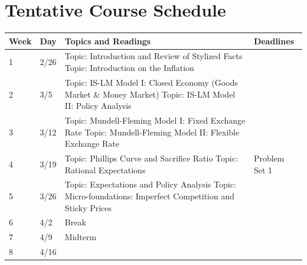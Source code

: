 \documentclass[12pt]{article}
\begin{document}
\section*{Tentative Course Schedule}

\newlength\bb
\setlength{}
\newlength\qq
\setlength{}
\newlength\rr
\setlength{}
\newlength\pp
\setlength{}
\begin{tabular}{|p{\bb}|p{\bb}|p{\pp}|p{\rr}|}
    \hline
        Week & Day & Topics and Readings & Deadlines \\
    \hline
    \hline
        1
        &
        2/26
        &
        Topic: Introduction and Review of Stylized Facts
        \newline
        Topic: Introduction on the Inflation
        &
    \\
    \hline
        2
        &
        3/5
        &
        Topic: IS-LM Model I: Closed Economy (Goods Market \& Money Market)
        \newline
        Topic: IS-LM Model II: Policy Analysis
        &
    \\
    \hline

 3
        &
        3/12
        &
        Topic: Mundell-Fleming Model I: Fixed Exchange Rate
        \newline
        Topic: Mundell-Fleming Model II: Flexible Exchange Rate
        &
    \\
    \hline
        4
        &

   3/19
        &
        Topic: Phillips Curve and Sacrifice Ratio
        \newline
        Topic: Rational Expectations
        &
        Problem Set 1
    \\
    \hline
        5
        &
        3/26
        &
        Topic: Expectations and Policy Analysis
     \newline
        Topic: Micro-foundations: Imperfect Competition and Sticky Prices
        &
    \\
    \hline
        6
        &
        4/2
        &
        Break
        &
    \\
    \hline

     7
        &
        4/9
        &
        Midterm
        \newline
        &
    \\
    \hline
        8
        &
        4/16


\end{tabular}
\end{document}
